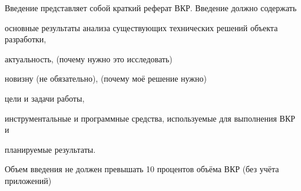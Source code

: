 

Введение представляет собой краткий реферат ВКР. Введение должно содержать 

основные результаты анализа существующих технических решений объекта разработки, 

актуальность, (почему нужно это исследовать)

новизну (не обязательно), (почему моё решение нужно)

цели и задачи работы, 

инструментальные и программные средства, используемые для выполнения ВКР и 

планируемые результаты.

Объем введения не должен превышать 10 процентов объёма ВКР (без учёта приложений)
